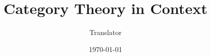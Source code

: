 \documentclass[12pt, openany, leqno]{book}
\begin{document}
\frontmatter
\title{Category Theory in Context}
\author{Translator}
\date{\today}
\maketitle

\tableofcontents

\mainmatter


% 
% 


\end{document}
